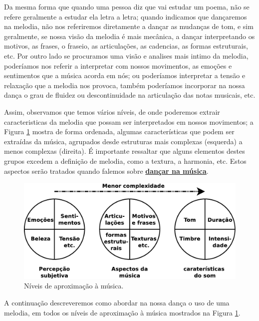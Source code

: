 Da mesma forma que quando uma pessoa diz que vai estudar um poema, 
não se refere geralmente a estudar ela letra a letra;
quando indicamos que dançaremos na melodia,
não nos referiremos diretamente a dançar as mudanças de tom, 
e sim geralmente, se nossa visão da melodia é mais mecânica, a dançar interpretando os motivos, as frases,
o fraseio, as articulações, as cadencias, as formas estruturais, etc.
Por outro lado se procuramos uma visão e analises mais intimo da melodia,
poderíamos nos referir a interpretar com nossos movimentos, as emoções e sentimentos que a música acorda em nós;
ou poderíamos interpretar a tensão e relaxação que a melodia nos provoca,
também poderíamos incorporar na nossa dança o grau de fluidez ou descontinuidade na articulação das notas musicais, etc.

Assim, observamos que temos vários níveis, 
de onde poderemos extrair caracteristicas da melodia que possam ser interpretados em nossos movimentos;
a Figura \ref{fig:etapa-melodica-1} mostra de forma ordenada,
algumas características que podem ser extraídas da música, 
agrupados desde estruturas mais complexas (esquerda) a menos complexas (direita).
É importante ressaltar que alguns elementos destes grupos excedem a definição de melodia, como a textura, a harmonia, etc.
Estos aspectos serão tratados quando falemos sobre \hyperref[subsec:dancamusica]{\textbf{dançar na música}}.

\begin{figure}[!h]
    \centering
    \includegraphics[width=\textwidth]{chapters/cap-musicalidade-tecnica/etapa-melodica-1.eps}
    \caption{Níveis de aproximação à música.}
    \label{fig:etapa-melodica-1}
\end{figure}

A continuação descreveremos como abordar na nossa dança o uso de uma melodia,
em todos os níveis de aproximação à música mostrados na Figura \ref{fig:etapa-melodica-1}.

